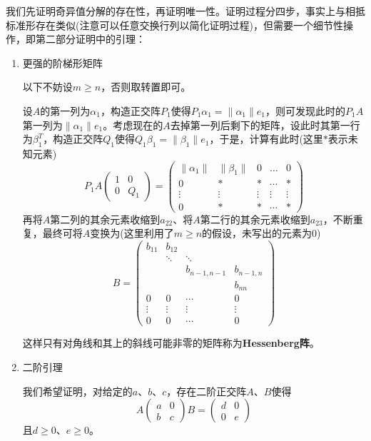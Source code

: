 \documentclass[a4paper,UTF8,fontset=windows]{ctexart}
\newcommand*{\note}{\noindent *}
\begin{document}
我们先证明奇异值分解的存在性，再证明唯一性。证明过程分四步，事实上与相抵标准形存在类似(注意可以任意交换行列以简化证明过程)，但需要一个细节性操作，即第二部分证明中的引理：
\begin{enumerate}
    \item 更强的阶梯形矩阵

    以下不妨设$m\ge n$，否则取转置即可。

    设$A$的第一列为$\alpha_1$，构造正交阵$P_1$使得$P_1\alpha_1=\|\alpha_1\|e_1$，则可发现此时的$P_1A$第一列为$\|\alpha_1\|e_1$。考虑现在的$A$去掉第一列后剩下的矩阵，设此时其第一行为$\beta_1^T$，构造正交阵$Q_1$使得$Q_1\beta_1=\|\beta_1\|e_1$，于是，计算有此时(这里$*$表示未知元素)
    $$P_1A\begin{pmatrix}1&0\\0&Q_1\end{pmatrix}=\begin{pmatrix}\|\alpha_1\|&\|\beta_1\|&0&\dots&0\\0&*&*&\cdots&*\\\vdots&\vdots&\vdots&\vdots&\vdots\\0&*&*&\cdots&*\end{pmatrix}$$
    再将$A$第二列的其余元素收缩到$a_{22}$、将$A$第二行的其余元素收缩到$a_{23}$，不断重复，最终可将$A$变换为(这里利用了$m\ge n$的假设，未写出的元素为0)
    $$B=\begin{pmatrix}b_{11}&b_{12}\\ &\ddots&\ddots\\ & &b_{n-1,n-1}&b_{n-1,n}\\ & & & b_{nn}\\0&0&\cdots&0\\\vdots&\vdots&\vdots&\vdots\\0&0&\cdots&0\end{pmatrix}$$

    \note 这样只有对角线和其上的斜线可能非零的矩阵称为\textbf{Hessenberg阵}。

    \item 二阶引理
    
    我们希望证明，对给定的$a$、$b$、$c$，存在二阶正交阵$A$、$B$使得
    $$A\begin{pmatrix}a&0\\b&c\end{pmatrix}B=\begin{pmatrix}d&0\\0&e\end{pmatrix}$$
    且$d\ge0$、$e\ge0$。


\end{enumerate}
\end{document}

